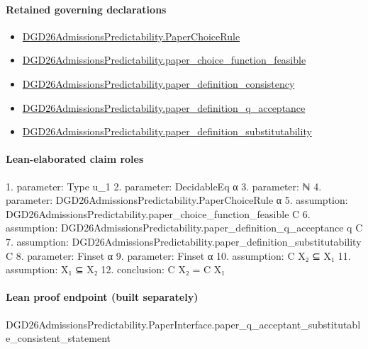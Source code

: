 \documentclass[10pt]{article}
\begin{document}
\paragraph{Retained governing declarations}
\begin{itemize}\raggedright
\item \hyperlink{governing-declaration-4678951b4432b184}{DGD26\allowbreak{}Admissions\allowbreak{}Predictability.\allowbreak{}Paper\allowbreak{}Choice\allowbreak{}Rule}
\item \hyperlink{governing-declaration-f7de74a44053f6d5}{DGD26\allowbreak{}Admissions\allowbreak{}Predictability.\allowbreak{}paper\_\allowbreak{}choice\_\allowbreak{}function\_\allowbreak{}feasible}
\item \hyperlink{governing-declaration-2c6907b2b3cc5a08}{DGD26\allowbreak{}Admissions\allowbreak{}Predictability.\allowbreak{}paper\_\allowbreak{}definition\_\allowbreak{}consistency}
\item \hyperlink{governing-declaration-7ecd62274fb2f391}{DGD26\allowbreak{}Admissions\allowbreak{}Predictability.\allowbreak{}paper\_\allowbreak{}definition\_\allowbreak{}q\_\allowbreak{}acceptance}
\item \hyperlink{governing-declaration-39cdd64a379d386b}{DGD26\allowbreak{}Admissions\allowbreak{}Predictability.\allowbreak{}paper\_\allowbreak{}definition\_\allowbreak{}substitutability}
\end{itemize}
\paragraph{Lean-elaborated claim roles}\begin{ReviewVerbatim}
1. parameter: Type u_1
2. parameter: DecidableEq α
3. parameter: ℕ
4. parameter: DGD26AdmissionsPredictability.PaperChoiceRule α
5. assumption: DGD26AdmissionsPredictability.paper_choice_function_feasible C
6. assumption: DGD26AdmissionsPredictability.paper_definition_q_acceptance q C
7. assumption: DGD26AdmissionsPredictability.paper_definition_substitutability C
8. parameter: Finset α
9. parameter: Finset α
10. assumption: C X₂ ⊆ X₁
11. assumption: X₁ ⊆ X₂
12. conclusion: C X₂ = C X₁
\end{ReviewVerbatim}

\paragraph{Lean proof endpoint (built separately)}\begin{ReviewVerbatim}
DGD26AdmissionsPredictability.PaperInterface.paper_q_acceptant_substitutable_consistent_statement
\end{ReviewVerbatim}
\end{document}

